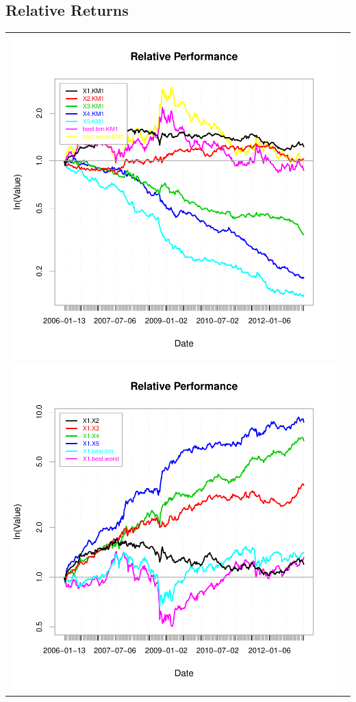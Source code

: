 \documentclass{article}
\begin{document}
\subsection{Relative Returns}
\begin{tabular}{cc}
\includegraphics{graphics/plot-006}
\includegraphics{graphics/plot-007}
\end{tabular}
\end{document}
